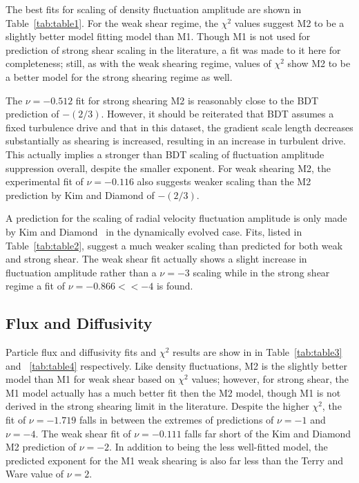 \documentclass[aip,pop,amsmath,amssymb,preprint,superscriptaddress]{revtex4-1} %
\begin{document}
The best fits for scaling of density fluctuation amplitude are shown in Table~\ref{tab:table1}. For the weak shear regime, the $\chi^{2}$ values suggest M2 to be a slightly better model fitting model than M1. Though M1 is not used for prediction of strong shear scaling in the literature, a fit was made to it here for completeness; still, as with the weak shearing regime, values of $\chi^{2}$ show M2 to be a better model for the strong shearing regime as well.

The $\nu = -0.512$ fit for strong shearing M2 is reasonably close to the BDT prediction of $-(2/3)$. However, it should be reiterated that BDT assumes a fixed turbulence drive and that in this dataset, the gradient scale length decreases substantially as shearing is increased, resulting in an increase in turbulent drive.  This actually implies a stronger than BDT scaling of fluctuation amplitude suppression overall, despite the smaller exponent. For weak shearing M2, the experimental fit of $\nu = -0.116$ also suggests weaker scaling than the M2 prediction by Kim and Diamond of $-(2/3)$.

A prediction for the scaling of radial velocity fluctuation amplitude is only made by Kim and Diamond~\cite{kim04} in the dynamically evolved case. Fits, listed in Table~\ref{tab:table2}, suggest a much weaker scaling than predicted for both weak and strong shear. The weak shear fit actually shows a slight increase in fluctuation amplitude rather than a $\nu = -3$ scaling while in the strong shear regime a fit of $\nu = -0.866 << -4$ is found.

\subsection{Flux and Diffusivity}

Particle flux and diffusivity fits and $\chi^{2}$ results are show in in Table~\ref{tab:table3} and ~\ref{tab:table4} respectively. Like density fluctuations, M2 is the slightly better model than M1 for weak shear based on $\chi^{2}$ values; however, for strong shear, the M1 model actually has a much better fit then the M2 model, though M1 is not derived in the strong shearing limit in the literature. Despite the higher $\chi^{2}$, the fit of $\nu = -1.719$ falls in between the 
extremes of predictions of $\nu = -1$ and $\nu = -4$. The weak shear fit of $\nu = -0.111$ falls far short of the Kim and Diamond M2 prediction of $\nu = -2$. In addition to being the less well-fitted model, the predicted exponent for the M1 weak shearing is also far less than the Terry and Ware value of $\nu = 2$.
\end{document}
